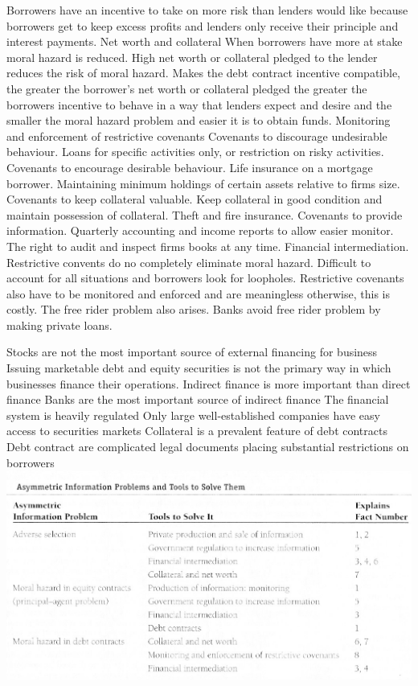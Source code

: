 \documentclass[12pt]{examnotes}
\begin{document}
\ra Borrowers have an incentive to take on more risk than lenders would like because borrowers get to keep excess profits and lenders only receive their principle and interest payments.
\vspace{6pt}
 Net worth and collateral
\rna When borrowers have more at stake moral hazard is reduced.
\rna High net worth or collateral pledged to the lender reduces the risk of moral hazard.
\rna Makes the debt contract incentive compatible, the greater the borrower's net worth or collateral pledged the greater the borrowers incentive to behave in a way that lenders expect and desire and the smaller the moral hazard problem and easier it is to obtain funds.
 Monitoring and enforcement of restrictive covenants
\rna Covenants to discourage undesirable behaviour. Loans for specific activities only, or restriction on risky activities.
\rna Covenants to encourage desirable behaviour. Life insurance on a mortgage borrower. Maintaining minimum holdings of certain assets relative to firms size.
\rna Covenants to keep collateral valuable. Keep collateral in good condition and maintain possession of collateral. Theft and fire insurance.
\rna Covenants to provide information. Quarterly accounting and income reports to allow easier monitor. The right to audit and inspect firms books at any time.
 Financial intermediation. 
\ra Restrictive convents do no completely eliminate moral hazard. Difficult to account for all situations and borrowers look for loopholes.
\ra Restrictive covenants also have to be monitored and enforced and are meaningless otherwise, this is costly. 
\ra The free rider problem also arises.
\ra Banks avoid free rider problem by making private loans.


 Stocks are not the most important source of external financing for business
 Issuing marketable debt and equity securities is not the primary way in which businesses finance their operations.
 Indirect finance is more important than direct finance
 Banks are the most important source of indirect finance
 The financial system is heavily regulated
 Only large well-established companies have easy access to securities markets
 Collateral is a prevalent feature of debt contracts
 Debt contract are complicated legal documents placing substantial restrictions on borrowers 
\includegraphics[scale=0.5]{./imgs/81.jpg}
\end{document}
